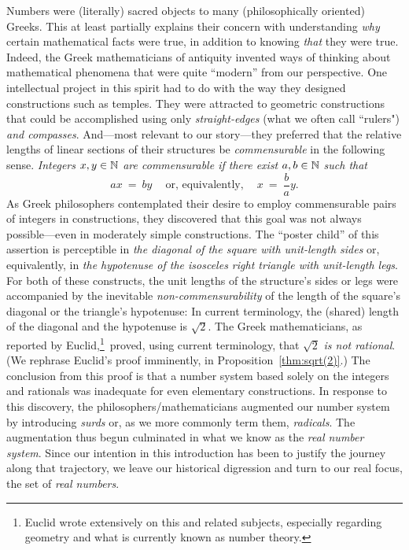 Numbers were (literally) sacred objects to many (philosophically oriented) Greeks.  This at least partially explains their concern with understanding {\em why} certain mathematical facts were true, in addition to knowing {\em that} they were true.  Indeed, the Greek mathematicians of antiquity invented ways of thinking about mathematical phenomena that were quite ``modern'' from our perspective.  One intellectual project in this spirit had to do with the way they designed constructions such as temples.  They were attracted to geometric constructions that could be
accomplished using only {\em straight-edges} (what we often call ``rulers") {\em and compasses}.  And---most relevant to our story---they preferred that the relative lengths of linear sections of their structures be {\em commensurable} in the following sense.  {\em Integers $x,y \in \mathbb{N}$ are {\em commensurable} if there exist $a, b \in \mathbb{N}$ such that}
\[ 
ax \ = \ by \ \ \ \ \mbox{ or, equivalently, } \ \ \ \ x \ = \ \frac{b}{a} y.
\]
As Greek philosophers contemplated their desire to employ commensurable pairs of integers in constructions, they discovered that this goal was not always possible---even in moderately simple constructions.  The ``poster child'' of this assertion is perceptible in {\it the diagonal of the square with unit-length sides} or, equivalently, in {\it the hypotenuse of the isosceles right triangle with unit-length legs}.  For both of these constructs, the unit lengths of the structure's sides or legs were accompanied by the inevitable {\em non-commensurability} of the length of the square's diagonal or the triangle's hypotenuse: In current terminology, the (shared) length of the diagonal and the hypotenuse is $\sqrt{2}$.  The Greek mathematicians, as reported by Euclid,\footnote{Euclid wrote extensively on this and related subjects, especially regarding geometry and what is currently known as number theory.}~proved, using current terminology, that $\sqrt{2}$ {\em is not rational}.  (We rephrase Euclid's proof imminently, in Proposition~\ref{thm:sqrt(2)}.)  The conclusion from this proof is that a number system based solely on the integers and rationals was inadequate for even elementary constructions.  In response to this discovery, the philosophers/mathematicians augmented our number system by introducing {\it surds} or, as we more commonly term them, {\it radicals}.  The augmentation thus begun culminated in what we know as the {\it real number system}.  Since our intention in this introduction has been to justify the journey along that trajectory, we leave our historical digression and turn to our real focus, the set of {\it real numbers}.
   

